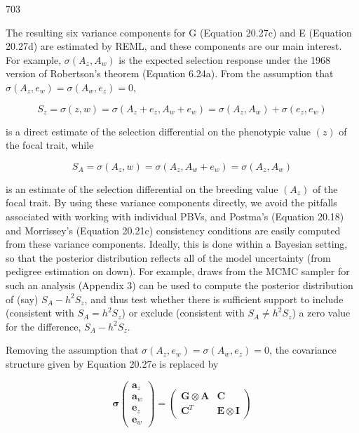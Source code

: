 \documentclass{article}
\begin{document}
703

The resulting six variance components for G (Equation 20.27c) and E (Equation 20.27d) are estimated by REML, and these components are our main interest. For example,  $ \sigma(A_z, A_w) $ is the expected selection response under the 1968 version of Robertson's theorem (Equation 6.24a). From the assumption that  $ \sigma(A_z, e_w) = \sigma(A_w, e_z) = 0 $,

\begin{equation}
S_{z}=\sigma(z,w)=\sigma(A_{z}+e_{z},A_{w}+e_{w})=\sigma(A_{z},A_{w})+\sigma(e_{z},e_{w})
\tag{20.28a}
\label{eq:20_28a}
\end{equation}

is a direct estimate of the selection differential on the phenotypic value  $ (z) $ of the focal trait, while

\begin{equation}
S_{A}=\sigma(A_{z},w)=\sigma(A_{z},A_{w}+e_{w})=\sigma(A_{z},A_{w})
\tag{20.28b}
\label{eq:20_28b}
\end{equation}

is an estimate of the selection differential on the breeding value  $ (A_z) $ of the focal trait. By using these variance components directly, we avoid the pitfalls associated with working with individual PBVs, and Postma's (Equation 20.18) and Morrissey's (Equation 20.21c) consistency conditions are easily computed from these variance components. Ideally, this is done within a Bayesian setting, so that the posterior distribution reflects all of the model uncertainty (from pedigree estimation on down). For example, draws from the MCMC sampler for such an analysis (Appendix 3) can be used to compute the posterior distribution of (say)  $ S_A - h^2 S_z $, and thus test whether there is sufficient support to include (consistent with  $ S_A = h^2 S_z $) or exclude (consistent with  $ S_A \neq h^2 S_z $) a zero value for the difference,  $ S_A - h^2 S_z $.

Removing the assumption that  $ \sigma(A_{z}, e_{w}) = \sigma(A_{w}, e_{z}) = 0 $, the covariance structure given by Equation 20.27e is replaced by

\begin{equation}
\boldsymbol{\sigma}\begin{pmatrix}\mathbf{a}_{z}\\ \mathbf{a}_{w}\\ \mathbf{e}_{z}\\ \mathbf{e}_{w}\end{pmatrix}=\begin{pmatrix}\mathbf{G}\otimes\mathbf{A}&\mathbf{C}\\ \mathbf{C}^{T}&\mathbf{E}\otimes\mathbf{I}\end{pmatrix}
\tag{20.29a}
\label{eq:20_29a}
\end{equation}
\end{document}
